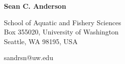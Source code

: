 \documentclass[11pt]{article}
\title{}
\author{}
\date{}
\begin{document}
\begin{spacing}{1}
\thispagestyle{empty}

{\LARGE \textbf{Sean C. Anderson}}\\
\vspace{-1.0mm}

School of Aquatic and Fishery Sciences\\
Box 355020, University of Washington\\
Seattle, WA 98195, USA

sandrsn@uw.edu\\

\vspace{-3.5mm}



\end{spacing}
\end{document}
